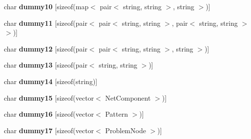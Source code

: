 \begin{DoxyCompactItemize}
\item 
char {\bfseries dummy10} \mbox{[}sizeof(map$<$ pair$<$ string, string $>$, string $>$)\mbox{]}\hypertarget{unionyy_1_1spec__parser_1_1union__type_ab3c2197435b6c69e264fa97de6ab5c9f}{}\label{unionyy_1_1spec__parser_1_1union__type_ab3c2197435b6c69e264fa97de6ab5c9f}

\item 
char {\bfseries dummy11} \mbox{[}sizeof(pair$<$ pair$<$ string, string $>$, pair$<$ string, string $>$ $>$)\mbox{]}\hypertarget{unionyy_1_1spec__parser_1_1union__type_a5d365e50797e47d5d8c7d8283741a6c1}{}\label{unionyy_1_1spec__parser_1_1union__type_a5d365e50797e47d5d8c7d8283741a6c1}

\item 
char {\bfseries dummy12} \mbox{[}sizeof(pair$<$ pair$<$ string, string $>$, string $>$)\mbox{]}\hypertarget{unionyy_1_1spec__parser_1_1union__type_a11236e5169da94926953669a8b3cd8d1}{}\label{unionyy_1_1spec__parser_1_1union__type_a11236e5169da94926953669a8b3cd8d1}

\item 
char {\bfseries dummy13} \mbox{[}sizeof(pair$<$ string, string $>$)\mbox{]}\hypertarget{unionyy_1_1spec__parser_1_1union__type_aa19b6e745a07de3e7a6a1ab43eb004ea}{}\label{unionyy_1_1spec__parser_1_1union__type_aa19b6e745a07de3e7a6a1ab43eb004ea}

\item 
char {\bfseries dummy14} \mbox{[}sizeof(string)\mbox{]}\hypertarget{unionyy_1_1spec__parser_1_1union__type_acae815e5ba8ca078ad2cf2b58402e86b}{}\label{unionyy_1_1spec__parser_1_1union__type_acae815e5ba8ca078ad2cf2b58402e86b}

\item 
char {\bfseries dummy15} \mbox{[}sizeof(vector$<$ Net\+Component $>$)\mbox{]}\hypertarget{unionyy_1_1spec__parser_1_1union__type_ad1f0004bd10103f737d9dcdf015ffe78}{}\label{unionyy_1_1spec__parser_1_1union__type_ad1f0004bd10103f737d9dcdf015ffe78}

\item 
char {\bfseries dummy16} \mbox{[}sizeof(vector$<$ Pattern $>$)\mbox{]}\hypertarget{unionyy_1_1spec__parser_1_1union__type_a70ee250075f4e84a60818a164e24d68a}{}\label{unionyy_1_1spec__parser_1_1union__type_a70ee250075f4e84a60818a164e24d68a}

\item 
char {\bfseries dummy17} \mbox{[}sizeof(vector$<$ Problem\+Node $>$)\mbox{]}\hypertarget{unionyy_1_1spec__parser_1_1union__type_afb2e7c300f40f817976de620daa3b87e}{}\label{unionyy_1_1spec__parser_1_1union__type_afb2e7c300f40f817976de620daa3b87e}


\end{DoxyCompactItemize}
